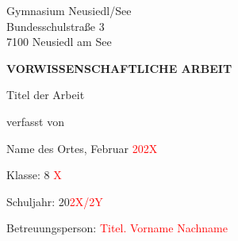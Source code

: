 \thispagestyle{empty}
\phantom{.}

\vspace{22.1mm}

\begin{center}
    Gymnasium Neusiedl/See\\
    \vspace{0.7mm}
    Bundesschulstraße 3\\
\vspace{0.7mm}
7100 Neusiedl am See

\vspace{21mm}

{\fontsize{20}{24}\selectfont \textbf{VORWISSENSCHAFTLICHE ARBEIT}}


\vspace{21.6mm}
Titel der Arbeit
\begin{Large}

    \textcolor{red}{{{{\dinregular\fontsize{20}{24}\selectfont{Titel der VWA}}}}}

\end{Large}

\vspace{29.1mm}
verfasst von\\

\vspace{5.5mm}
\begin{Large}
\textcolor{red}{{\dinregular\fontsize{20}{24}\selectfont{Vorname Nachname}}}
\end{Large}
\end{center}
\begin{small}
    

\vspace{29.3mm}
Name des Ortes, Februar \textcolor{red}{202X}

\vspace{0.75mm}
Klasse: 8 \textcolor{red}{X}

\vspace{0.73mm}
Schuljahr: 20\textcolor{red}{2X/2Y}

\vspace{0.73mm}
Betreuungsperson: \textcolor{red}{Titel. Vorname Nachname}
\end{small}
